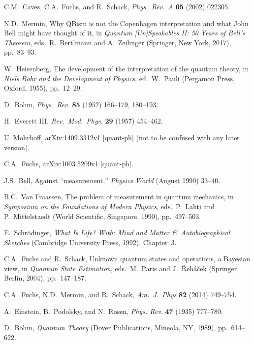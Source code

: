 \documentclass[smallextended]{svjour3}
\begin{document}
\begin{thebibliography}{99}
 C.M.\ Caves, C.A.\ Fuchs, and R.\ Schack, \emph{Phys.\ Rev.\ A} \textbf{65} (2002) 022305.

 N.D.\ Mermin, Why QBism is not the Copenhagen interpretation and what John Bell might have thought of it, in \textit{Quantum [Un]Speakables II: 50 Years of Bell's Theorem}, eds.\ R.\ Bertlmann and A.\ Zeilinger (Springer, New York, 2017), pp.\ 83--93.

 W.\ Heisenberg, The development of the interpretation of the quantum theory, in \textit{Niels Bohr and the Development of Physics}, ed.\ W.\ Pauli (Pergamon Press, Oxford, 1955), pp.\ 12--29.

 D.\ Bohm, \textit{Phys.\ Rev.} \textbf{85} (1952) 166--179, 180--193.

 H.\ Everett III, \textit{Rev.\ Mod.\ Phys.} \textbf{29} (1957)  454--462.

 U. Mohrhoff,  arXiv:1409.3312v1 [quant-ph] (not to be confused with any later version).

 C.A.\ Fuchs,  arXiv:1003.5209v1  [quant-ph].

  J.S.\ Bell, Against ``measurement,'' \textit{Physics World} (August 1990) 33--40.

 B.C.\ Van Fraassen, The problem of measurement in quantum mechanics, in \textit{Symposium on the Foundations of Modern Physics}, eds.\ P.\ Lahti and P.\ Mittelstaedt (World Scientific, Singapore, 1990), pp.\ 497--503.

 E.\ Schr\"odinger, \textit{What Is Life? With: Mind and Matter \&\ Autobiographical Sketches} (Cambridge University Press, 1992), Chapter~3.

 C.A.\ Fuchs and R.\ Schack, Unknown quantum states and operations, a Bayesian view, in \textit{Quantum State Estimation}, eds.\ M.\ Paris and J.\ \v{R}eh\'{a}\v{c}ek (Springer, Berlin, 2004), pp.\ 147--187.

  C.A.\ Fuchs, N.D.\ Mermin, and R.\ Schack, \textit{Am.\ J.\ Phys} \textbf{82} (2014) 749--754. 

 A.\ Einstein, B.\ Podolsky, and N.\ Rosen, \emph{Phys. Rev.} \textbf{47} (1935) 777--780.

 D.\ Bohm, \emph{Quantum Theory} (Dover Publications, Mineola, NY, 1989), pp.\ 614--622.


\end{thebibliography}
\end{document}
